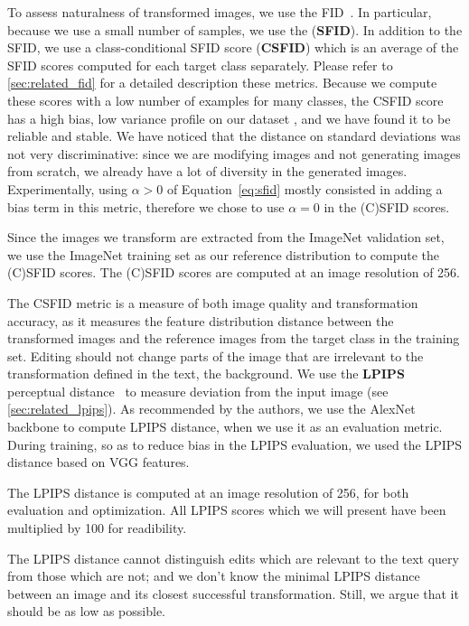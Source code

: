 To assess naturalness of  transformed images, we use the \ac{FID}~\citep{heusel2017gans}.
In particular, because we use a small number of samples, we use the (\textbf{\ac{SFID}}).
In addition to the \ac{SFID}, we use a class-conditional
 SFID score  (\textbf{CSFID}) which is an average of the \ac{SFID} scores computed for each 
 target class separately.
  Please refer to \ref{sec:related_fid} for a detailed description these metrics. 
 Because we compute these scores with a low number of examples 
  for many classes, the \ac{CSFID} score has a high bias, low variance profile on our
   dataset \citep{chong2020effectively}, and we  
 have found it to be reliable and stable. We have noticed that the distance on standard deviations was not very discriminative: 
 since we are modifying images and not generating images from scratch, we already have
  a lot of diversity in the generated images. 
  Experimentally, using $\alpha > 0$ of Equation~\ref{eq:sfid} mostly consisted in
   adding a bias term in this metric, therefore we chose to use $\alpha =0 $ in the (C)SFID scores. 

Since the images we transform are extracted from the ImageNet validation set, we use the ImageNet training set as our 
reference distribution to compute the (C)SFID scores. 
The (C)SFID scores are computed at an image resolution of 256.



The \ac{CSFID} metric is a measure of both image quality and transformation accuracy, as it 
measures the feature distribution distance between the transformed images and the 
reference images from the target class in the %
training set. 
Editing should not change parts of the image that are irrelevant to the transformation
 defined in the text,  \eg the background.  
We use the \textbf{LPIPS} perceptual distance~\citep{zhanglpips2018}  to measure deviation 
from the input image (see \ref{sec:related_lpips}). 
As recommended by the authors, we use the AlexNet~\cite{krizhevsky12nips} backbone to 
compute \ac{LPIPS} distance, when we use it as
an evaluation metric. During training, so as to reduce bias in the \ac{LPIPS} evaluation, we used the 
\ac{LPIPS} distance based on VGG features.

The \ac{LPIPS}  distance is computed at an image resolution of 256, for both evaluation and 
optimization.
All \ac{LPIPS}  scores which we will present have been multiplied by 100 for readibility.

The \ac{LPIPS}  distance cannot distinguish edits which are relevant to the text 
query from those which are not; and we don't know the minimal \ac{LPIPS} distance between 
an image and its closest successful transformation. Still, we argue that it should be 
as low as possible.


